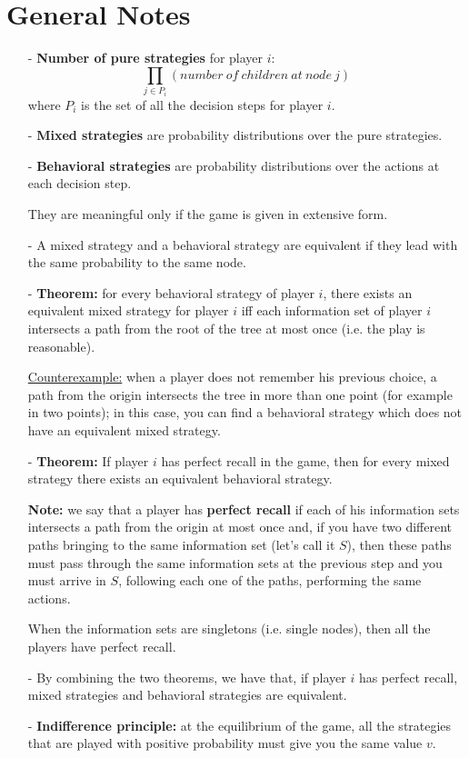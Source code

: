 \documentclass[pt11,a4paper,twoside,reqno,openright]{paper}
\begin{document}
\section{General Notes}

\begin{itemize}
	\item[-] \textbf{Number of pure strategies} for player $i$:
		\[
			\prod_{j \in P_i}{\left(number~of~children 
			~at~node~j\right)}
		\]
		where $P_i$ is the set of all the decision steps for 
		player $i$.
	\item[-] \textbf{Mixed strategies} are probability distributions 
		over the pure strategies.
	\item[-] \textbf{Behavioral strategies} are probability 
		distributions over the actions at each decision step.

		\noindent They are meaningful only if the game is given in 
		extensive form.
	\item[-] A mixed strategy and a behavioral strategy are equivalent 
		if they lead with the same probability to the same node.
	\item[-] \textbf{Theorem:} for every behavioral strategy of player 
		$i$, there exists an equivalent mixed strategy for player 
		$i$ iff each information 
		set of player $i$ intersects a path from the root of the 
		tree at most once (i.e. the play is reasonable).

		\noindent \underline{Counterexample:} when a player does 
		not remember his previous choice, a path from the origin 
		intersects the tree in more than one point (for example 
		in two points); in this case, you can find a behavioral 
		strategy which does not have an equivalent mixed strategy.
	\item[-] \textbf{Theorem:} If player $i$ has perfect recall in the 
		game, then for every mixed strategy there exists an 
		equivalent behavioral strategy.

		\noindent \textbf{Note:} we say that a player has 
		\textbf{perfect recall} if each of his information sets 
		intersects a path from the origin at most once and, if 
		you have two different paths bringing to the same 
		information set (let's call it $S$), then these paths must 
		pass through the same information sets at the previous step 
		and you must arrive in $S$, following each one of the paths, 
		performing the same actions.

		\noindent When the information sets are singletons (i.e. 
		single nodes), then all the players have perfect recall.
	\item[-] By combining the two theorems, we have that, if player $i$ 
		has perfect recall, mixed strategies and behavioral 
		strategies are equivalent.
	\item[-] \textbf{Indifference principle:} at the equilibrium of the 
		game, all the strategies that are played with positive 
		probability must give you the same value $v$.


\end{itemize}
\end{document}
